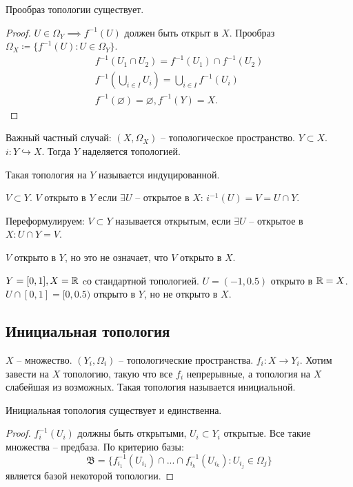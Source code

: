 \documentclass[main]{subfiles}
\begin{document}
\begin{theorem}
    Прообраз топологии существует.
\end{theorem}
\begin{proof}
    $U \in \Omega_Y \implies f^{-1}(U)$ должен быть открыт в $X$.
    Прообраз $\Omega_X \coloneqq \{f^{-1}(U) : U \in \Omega_Y\}$.
    \begin{gather*}
        f^{-1}(U_1 \cap U_2) = f^{-1}(U_1) \cap f^{-1}(U_2)\\
        f^{-1}\left(\bigcup_{i \in I} U_i\right) = \bigcup_{i \in I} f^{-1}(U_i)\\
        f^{-1}(\varnothing) = \varnothing, f^{-1}(Y) = X.
    \end{gather*}
\end{proof}

Важный частный случай: $(X, \Omega_X)$ -- топологическое пространство. $Y \subset X$.
$i: Y \hookrightarrow X$. Тогда $Y$ наделяется топологией.

\begin{definition}
    Такая топология на $Y$ называется индуцированной.
\end{definition}
$V \subset Y$. $V$ открыто в $Y$ если $\exists U$ -- открытое в $X$: $i^{-1}(U) = V = U \cap Y$.

\begin{definition}
    Переформулируем: $V \subset Y$ называется открытым, если $\exists U$ -- открытое в $X: U \cap Y = V$.
\end{definition}

\begin{remark}
    $V$ открыто в $Y$, но это не означает, что $V$ открыто в $X$.

    $Y = [0,1], X = \mathbb{R}$ cо стандартной топологией.
    $U = (-1, 0.5)$ открыто в $\mathbb{R} = X$.
    $U \cap [0,1] = [0, 0.5)$ открыто в $Y$, но не открыто в $X$.
\end{remark}

\subsection{Инициальная топология}
\begin{definition}
    $X$ -- множество. $(Y_i, \Omega_i)$ -- топологические пространства.
    $f_i: X \to Y_i$.
    Хотим завести на $X$ топологию, такую что все $f_i$ непрерывные, а топология на $X$ слабейшая из возможных.
    Такая топология называется инициальной.
\end{definition}

\begin{theorem}
    Инициальная топология существует и единственна.
\end{theorem}
\begin{proof}
    $f^{-1}_i(U_i)$ должны быть открытыми, $U_i \subset Y_i$ открытые.
    Все такие множества -- предбаза.
    По критерию базы:
    \[\mathfrak{B} = \{f^{-1}_{i_1} (U_{i_1}) \cap ... \cap f^{-1}_{i_k} (U_{i_k}) : U_{i_j} \in \Omega_j\}\]
    является базой некоторой топологии.
\end{proof}
\end{document}
